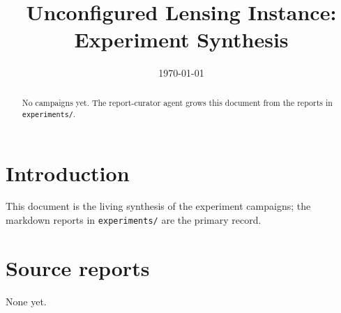 \documentclass[11pt]{article}
\title{Unconfigured Lensing Instance: Experiment Synthesis}
\author{}
\date{\today}
\begin{document}
\maketitle

\begin{abstract}
No campaigns yet. The report-curator agent grows this document from the
reports in \texttt{experiments/}.
\end{abstract}

\section{Introduction}
This document is the living synthesis of the experiment campaigns; the
markdown reports in \texttt{experiments/} are the primary record.

\appendix
\section{Source reports}
None yet.
\end{document}
